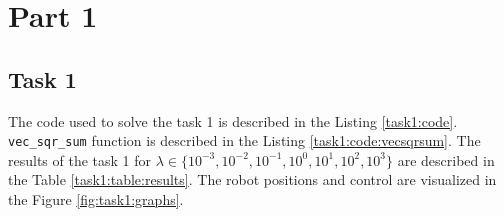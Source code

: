 
\section{Part 1}
\subsection{Task 1}

The code used to solve the task 1 is described in the Listing \ref{task1:code}. \lstinline{vec_sqr_sum} function is described in the Listing \ref{task1:code:vecsqrsum}. The results of the task 1 for $\lambda \in \{ 10^{-3}, 10^{-2}, 10^{-1}, 10^0, 10^1, 10^2, 10^3 \}$ are described in the Table \ref{task1:table:results}. The robot positions and control are visualized in the Figure \ref{fig:task1:graphs}.

